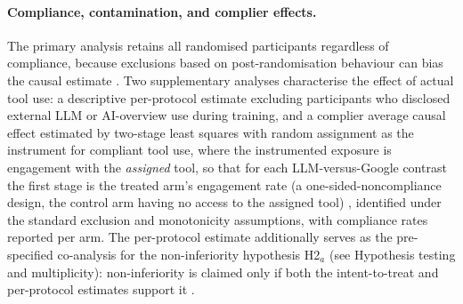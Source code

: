 \paragraph{Compliance, contamination, and complier effects.}
The primary analysis retains all randomised participants regardless of compliance, because exclusions based on post-randomisation behaviour can bias the causal estimate \parencite{montgomery2018post}. %
Two supplementary analyses characterise the effect of actual tool use: a descriptive per-protocol estimate excluding participants who disclosed external LLM or AI-overview use during training, and a complier average causal effect estimated by two-stage least squares with random assignment as the instrument for compliant tool use, where the instrumented exposure is engagement with the \emph{assigned} tool, so that for each LLM-versus-Google contrast the first stage is the treated arm's engagement rate (a one-sided-noncompliance design, the control arm having no access to the assigned tool) \parencite{angrist1996}, %
identified under the standard exclusion and monotonicity assumptions, with compliance rates reported per arm. The per-protocol estimate additionally serves as the pre-specified co-analysis for the non-inferiority hypothesis H2$_a$ (see Hypothesis testing and multiplicity): non-inferiority is claimed only if both the intent-to-treat and per-protocol estimates support it \parencite{piaggio2012}.

